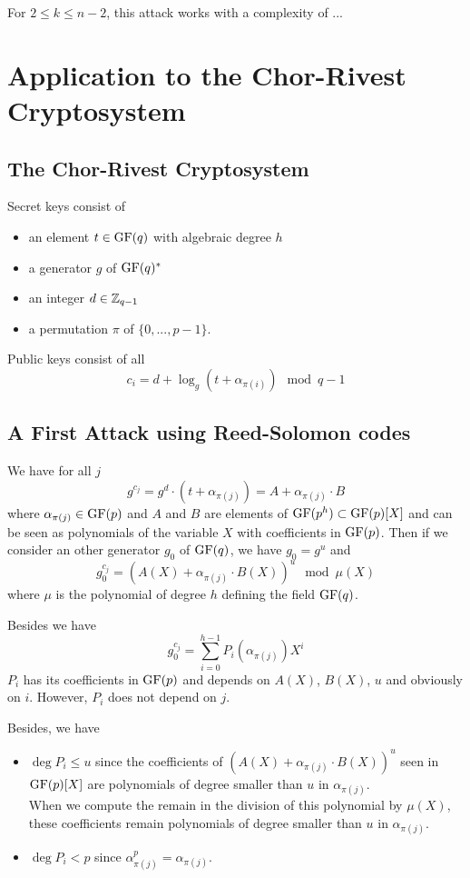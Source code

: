 \documentclass[12pt,a4paper,titlepage]{article}
\begin{document}
For $2 \leq k \leq n-2$, this attack works with a complexity of ...


\section{Application to the Chor-Rivest Cryptosystem}

\subsection{The Chor-Rivest Cryptosystem}

Secret keys consist of
\begin{itemize}
\item an element $t \in \text{GF}(q)$ with algebraic degree $h$
\item a generator $g$ of $\text{GF} (q)^{\ast} $
\item an integer $d \in \mathbb{Z}_{q-1} $
\item a permutation $\pi$ of $\{ 0, ... , p-1 \}$.
\end{itemize}

Public keys consist of all
$$ c_i = d + \log_g(t + \alpha_{\pi(i)}) \mod q-1 $$

\subsection{A First Attack using Reed-Solomon codes}

We have for all $j$
$$ g^{c_j} = g^d \cdot (t + \alpha_{\pi(j)} ) = A + \alpha_{\pi(j)} \cdot B $$
where $\alpha_{\pi(j)} \in \text{GF}(p)$ and $A$ and $B$ are elements of $\text{GF}(p^h) \subset \text{GF}(p)[X]$ and can be seen as polynomials of the variable $X$ with coefficients in $\text{GF}(p)$.
Then if we consider an other generator $g_0$ of $\GF(q)^{\*}$, we have $g_0 = g^u$ and
$$ g_0 ^{c_j} = \left( A(X) + \alpha_{\pi(j)} \cdot B(X) \right)^u \mod \mu(X) $$
where $\mu$ is the polynomial of degree $h$ defining the field $\text{GF}(q)$.

Besides we have
$$ g_0 ^{c_j} = \sum_{i=0}^{h-1} P_i(\alpha_{\pi(j)}) X^i $$
$P_i$ has its coefficients in $\text{GF}(p)$ and depends on $A(X)$, $B(X)$, $u$ and obviously on $i$. However, $P_i$ does not depend on $j$.

Besides, we have
\begin{itemize}
\item $\deg P_i \leq u$ since the coefficients of $\left( A(X) + \alpha_{\pi(j)} \cdot B(X) \right)^u$ seen in $\text{GF}(p)[X]$ are polynomials of degree smaller than $u$ in $\alpha_{\pi(j)}$.\\
When we compute the remain in the division of this polynomial by $\mu(X)$, these coefficients remain polynomials of degree smaller than $u$ in $\alpha_{\pi(j)}$.
\item $\deg P_i < p$ since $\alpha_{\pi(j)}^p = \alpha_{\pi(j)}$.
\end{itemize}
\end{document}
